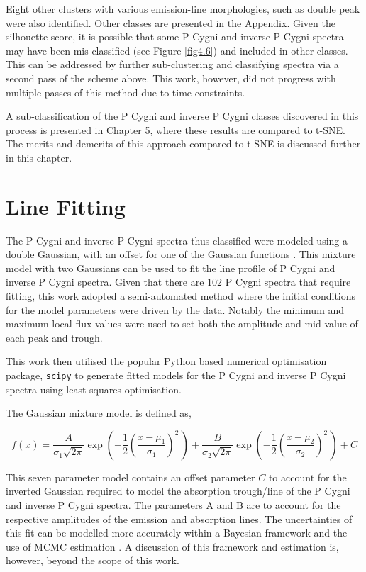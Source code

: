 Eight other clusters with various emission-line morphologies, such as double peak were also identified. Other classes are presented in the Appendix. Given the silhouette score, it is possible that some P Cygni and inverse P Cygni spectra may have been mis-classified (see Figure \ref{fig4.6}) and included in other classes. This can be addressed by further sub-clustering and classifying spectra via a second pass of the scheme above. This work, however, did not progress with multiple passes of this method due to time constraints. 

A sub-classification of the P Cygni and inverse P Cygni classes discovered in this process is presented in Chapter 5, where these results are compared to t-SNE. The merits and demerits of this approach compared to t-SNE is discussed further in this chapter. 

\section{Line Fitting}

The P Cygni and inverse P Cygni spectra thus classified were modeled using a double Gaussian, with an offset for one of the Gaussian functions \citep{traven2015gaia, zhang2021catalog}. This mixture model with two Gaussians can be used to fit the line profile of P Cygni and inverse P Cygni spectra. Given that there are 102 P Cygni spectra that require fitting, this work adopted a semi-automated method where the initial conditions for the model parameters were driven by the data. Notably the minimum and maximum local flux values were used to set both the amplitude and mid-value of each peak and trough.

This work then utilised the popular Python based numerical optimisation package, \texttt{scipy} \citep{2020SciPy-NMeth} to generate fitted models for the P Cygni and inverse P Cygni spectra using least squares optimisation.

The Gaussian mixture model is defined as, 

\begin{equation}
    f(x) = \frac{A}{\sigma_1\sqrt{2\pi}} 
  \exp\left( -\frac{1}{2}\left(\frac{x-\mu_1}{\sigma_1}\right)^{\!2}\,\right) + \frac{B}{\sigma_2\sqrt{2\pi}} 
  \exp\left( -\frac{1}{2}\left(\frac{x-\mu_2}{\sigma_2}\right)^{\!2}\,\right) + C
\end{equation}


This seven parameter model contains an offset parameter $C$ to account for the inverted Gaussian required to model the absorption trough/line of the P Cygni and inverse P Cygni spectra. The parameters A and B are to account for the respective amplitudes of the emission and absorption lines. The uncertainties of this fit can be modelled more accurately within a Bayesian framework and the use of MCMC estimation \citep{hogg2010data}. A discussion of this framework and estimation is, however, beyond the scope of this work.

